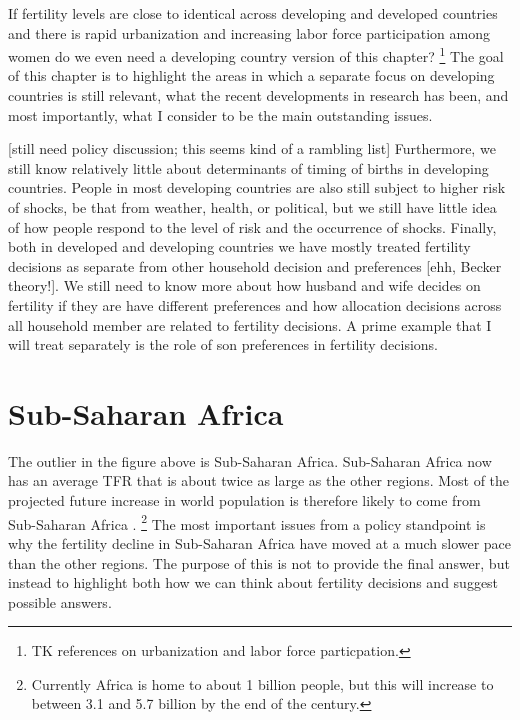 \documentclass[letterpaper,12pt]{article}
\begin{document}
If fertility levels are close to identical across developing and
developed countries and there is rapid urbanization and increasing
labor force participation among women do we even need a developing 
country version of this chapter?%
\footnote{
TK references on urbanization and labor force particpation.
}
The goal of this chapter is to highlight the areas in which a
separate focus on developing countries is still relevant,
what the recent developments in research has been, and
most importantly, what I consider to be the main
outstanding issues.

[still need policy discussion; this seems kind of a rambling list]
Furthermore, we still know relatively little about determinants
of timing of births in developing countries.
People in most developing countries are also still subject to
higher risk of shocks, be that from weather, health, or political,
but we still have little idea of how people respond to the level
of risk and the occurrence of shocks.
Finally, both in developed and developing countries we have
mostly treated fertility decisions as separate from other
household decision and preferences [ehh, Becker theory!].
We still need to know more about how husband and wife decides
on fertility if they are have different preferences 
and how allocation decisions across all household member are
related to fertility decisions.
A prime example that I will treat separately is the role
of son preferences in fertility decisions.









\section{Sub-Saharan Africa}

The outlier in the figure above is Sub-Saharan Africa. 
Sub-Saharan Africa now has an average TFR that is about twice
as large as the other regions.
Most of the projected future increase in world population 
is therefore likely to come from Sub-Saharan Africa 
\citep{Gerland2014}.%
\footnote{
Currently Africa is home to about 1 billion people, but this
will increase to between 3.1 and 5.7 billion by the end of
the century.
}
The most important issues from a policy standpoint is why the 
fertility decline in Sub-Saharan Africa have moved at a much
slower pace than the other regions.
The purpose of this is not to provide the final answer, but
instead to highlight both how we can think about fertility
decisions and suggest possible answers.
\end{document}
